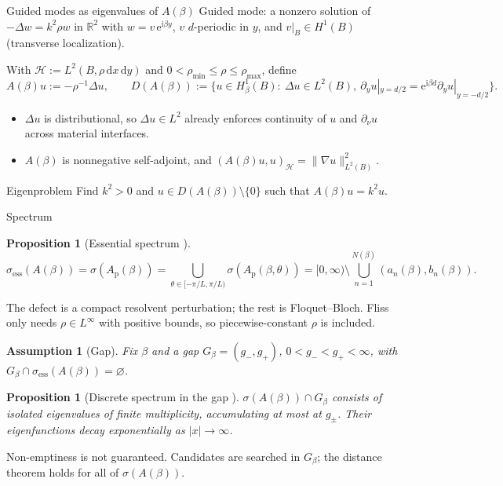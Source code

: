 \documentclass[aspectratio=169]{beamer}
\newcommand{\ii}{\mathrm{i}}
\newcommand{\ee}{\mathrm{e}}
\newcommand{\dd}{\mathrm{d}}
\newcommand{\RR}{\mathbb{R}}
\newcommand{\rin}{\rho_{\min}}
\newcommand{\rax}{\rho_{\max}}
\newtheorem{proposition}[theorem]{Proposition}
\newtheorem{assumption}[theorem]{Assumption}
\begin{document}
\begin{frame}{Guided modes as eigenvalues of $A(\beta)$}
  \small
  Guided mode: a nonzero solution of $-\Delta w=k^2\rho w$ in $\RR^2$ with
  $w=v\,\ee^{\ii\beta y}$, $v$ $d$-periodic in $y$, and $v|_B\in H^1(B)$
  (transverse localization).

  \medskip
  With $\mathcal H:=L^2(B,\rho\,\dd x\,\dd y)$ and $0<\rin\le\rho\le\rax$, define
  \cite{Fliss2013}
  \[
    A(\beta)u:=-\rho^{-1}\Delta u,\qquad
    D(A(\beta)):=\bigl\{u\in H^1_\beta(B):\ \Delta u\in L^2(B),\
      \partial_yu|_{y=d/2}=\ee^{\ii\beta d}\partial_yu|_{y=-d/2}\bigr\}.
  \]
  \begin{itemize}
    \item $\Delta u$ is distributional, so $\Delta u\in L^2$ already enforces
      continuity of $u$ and $\partial_\nu u$ across material interfaces.
    \item $A(\beta)$ is nonnegative self-adjoint, and
      $(A(\beta)u,u)_{\mathcal H}=\lVert\nabla u\rVert_{L^2(B)}^2$.
  \end{itemize}

  \begin{block}{Eigenproblem}
    Find $k^2>0$ and $u\in D(A(\beta))\setminus\{0\}$ such that $A(\beta)u=k^2u$.
  \end{block}
\end{frame}

\begin{frame}{Spectrum}
  \small
  \begin{proposition}[Essential spectrum {\cite[Prop.~3.1]{Fliss2013}}]
    \[
      \sigma_{\mathrm{ess}}(A(\beta))=\sigma(A_{\mathrm p}(\beta))
      =\bigcup_{\theta\in[-\pi/L,\pi/L)}\sigma(A_{\mathrm p}(\beta,\theta))
      =[0,\infty)\setminus\bigcup_{n=1}^{N(\beta)}(a_n(\beta),b_n(\beta)).
    \]
  \end{proposition}
  \vspace{-0.3em}
  {\footnotesize The defect is a compact resolvent perturbation; the rest is
  Floquet--Bloch. Fliss only needs $\rho\in L^\infty$ with positive bounds, so
  piecewise-constant $\rho$ is included.}

  \begin{assumption}[Gap]
    Fix $\beta$ and a gap $G_\beta=(g_-,g_+)$, $0<g_-<g_+<\infty$, with
    $G_\beta\cap\sigma_{\mathrm{ess}}(A(\beta))=\varnothing$.
  \end{assumption}

  \begin{proposition}[Discrete spectrum in the gap {\cite[Prop.~3.3, Thm.~3.5]{Fliss2013}}]
    $\sigma(A(\beta))\cap G_\beta$ consists of isolated eigenvalues of finite
    multiplicity, accumulating at most at $g_\pm$. Their eigenfunctions decay
    exponentially as $|x|\to\infty$.
  \end{proposition}
  {\footnotesize Non-emptiness is not guaranteed. Candidates are searched in
  $G_\beta$; the distance theorem holds for all of $\sigma(A(\beta))$.}
\end{frame}
\end{document}
